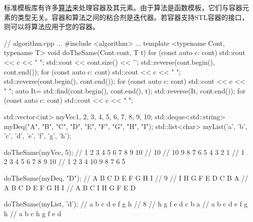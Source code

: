 
标准模板库有许多\href{http://en.cppreference.com/w/cpp/algorithm}{算法}来处理容器及其元素。由于算法是函数模板，它们与容器元素的类型无关。容器和算法之间的粘合剂是迭代器。若容器支持STL容器的接口，则可以将算法应用于您的容器。


\begin{cpp}
// algorithm.cpp
...
#include <algorithm>
...
template <typename Cont, typename T>
void doTheSame(Cont cont, T t){
	for (const auto c: cont) std::cout << c << " ";
	std::cout << cont.size() << '\n';
	std::reverse(cont.begin(), cont.end());
	for (const auto c: cont) std::cout << c << " ";
	std::reverse(cont.begin(), cont.end());
	for (const auto c: cont) std::cout << c << " ";
	auto It= std::find(cont.begin(), cont.end(), t);
	std::reverse(It, cont.end());
	for (const auto c: cont) std::cout << c << " ";
}

std::vector<int> myVec{1, 2, 3, 4, 5, 6, 7, 8, 9, 10};
std::deque<std::string> myDeq({"A", "B", "C", "D", "E", "F", "G", "H", "I"});
std::list<char> myList({'a', 'b', 'c', 'd', 'e', 'f', 'g', 'h'});

doTheSame(myVec, 5);
	// 1 2 3 4 5 6 7 8 9 10
	// 10
	// 10 9 8 7 6 5 4 3 2 1
	// 1 2 3 4 5 6 7 8 9 10
	// 1 2 3 4 10 9 8 7 6 5
	
doTheSame(myDeq, "D");
	// A B C D E F G H I
	// 9
	// I H G F E D C B A
	// A B C D E F G H I
	// A B C I H G F E D
	
doTheSame(myList, 'd');
	// a b c d e f g h
	// 8
	// h g f e d c b a
	// a b c d e f g h
	// a b c h g f e d
\end{cpp}





















